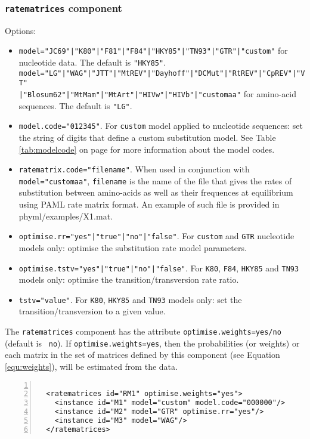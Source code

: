 \documentclass[a4paper,12pt]{article}
\newcommand{\x}[1]{\texttt{#1}}
\begin{document}
\subsubsection{{\tt ratematrices} component}\label{sec:xmlratematrices}
Options:
\begin{itemize}
\item \x{model="JC69"|"K80"|"F81"|"F84"|"HKY85"|"TN93"|"GTR"|"custom"} for nucleotide data. The default is \x{"HKY85"}.\\
\x{model="LG"|"WAG"|"JTT"|"MtREV"|"Dayhoff"|"DCMut"|"RtREV"|"CpREV"|"VT"}\\\x{|"Blosum62"|"MtMam"|"MtArt"|"HIVw"|"HIVb"|"customaa"}
for amino-acid sequences. The default is \x{"LG"}.
\item \x{model.code="012345"}. For \x{custom} model applied to nucleotide sequences: set the
  string of digits that define a custom substitution model. See Table \ref{tab:modelcode} on page
  \pageref{tab:modelcode} for more
  information about the model codes.
\item \x{ratematrix.code="filename"}. When used in conjunction with \x{model="customaa"},
  \x{filename} is the name of the file that gives the rates of substitution between amino-acids as
  well as their frequences at equilibrium using PAML rate matrix format. An example of such file is
  provided in {phyml/examples/X1.mat}.
\item \x{optimise.rr="yes"|"true"|"no"|"false"}. For \x{custom} and \x{GTR} nucleotide models only:
  optimise the substitution rate model parameters. 
\item \x{optimise.tstv="yes"|"true"|"no"|"false"}. For \x{K80}, \x{F84}, \x{HKY85} and \x{TN93}
  models only: optimise the transition/transversion rate ratio. 
\item \x{tstv="value"}. For \x{K80}, \x{HKY85} and \x{TN93} models only: set the transition/transversion to a
  given value.  
\end{itemize}

The {\tt ratematrices} component has the attribute {\tt optimise.weights=yes/no} (default is {\tt
  no}). If {\tt optimise.weights=yes}, then the probabilities (or weights) or each matrix in the
set of matrices defined by this component (see Equation \ref{equ:weights}), will be estimated from the data.

\vspace{0.2cm}
\begin{Verbatim}[frame=single, label=Example of `ratematrices' component, samepage=true,
  baselinestretch=0.5, fontsize=\small, numbers=left]

  <ratematrices id="RM1" optimise.weights="yes">
    <instance id="M1" model="custom" model.code="000000"/>
    <instance id="M2" model="GTR" optimise.rr="yes"/>
    <instance id="M3" model="WAG"/>
  </ratematrices>

\end{Verbatim}
\end{document}
